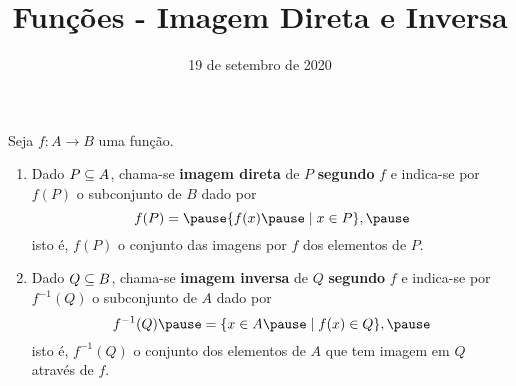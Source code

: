 \documentclass{beamer}
\title{Fun\c{c}\~oes - Imagem Direta e Inversa}
\author[\autor]{\autor}
\institute[\instituto]{\instituto}
\date{19 de setembro de 2020}
\begin{document}
    \begin{frame}
        \maketitle
    \end{frame}

    
    \begin{frame}
        \begin{definicao}
            Seja $f : A \to B$ \pause uma fun{\c c}{\~a}o.\pause
            \begin{enumerate}[label={\roman*})]
                \item Dado $P \subseteq A$, \pause chama-se \textbf{imagem direta} \pause de $P$ \pause \textbf{segundo} $f$ \pause e indica-se por $f(P)$ \pause o subconjunto de $B$ \pause dado por\pause
                \[
                    f(P) = \pause \{f(x) \pause \mid x \in P\},\pause
                \]
                isto {\'e}, \pause $f(P)$  o conjunto das imagens por $f$ \pause dos elementos de $P$.\pause
                
                \vspace{.5cm}

                \item Dado $Q \subseteq B$, \pause chama-se \textbf{imagem inversa} \pause de $Q$ \textbf{segundo} $f$ \pause e indica-se por \pause $f^{-1}(Q)$ \pause o subconjunto de $A$ \pause dado por\pause
                \[
                    f^{-1}(Q) \pause = \{x \in A \pause \mid f(x) \in Q\},\pause
                \]
                isto {\'e}, \pause $f^{-1}(Q)$  o conjunto dos elementos de $A$ \pause que tem imagem em $Q$ \pause atrav{\'e}s de $f$.\pause
            \end{enumerate}
        \end{definicao}
    \end{frame}
\end{document}
